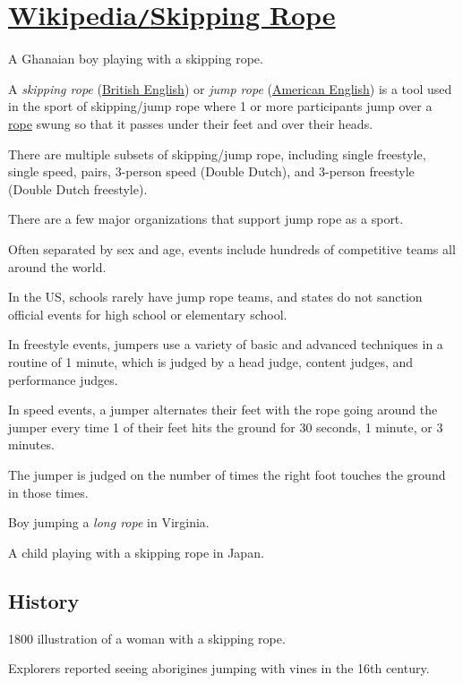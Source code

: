 \documentclass[oneside]{book}
\numberwithin{equation}{section}
\begin{document}

\section{\href{https://en.wikipedia.org/wiki/Skipping_rope}{Wikipedia\texttt{/}Skipping Rope}}
\textsf{A Ghanaian boy playing with a skipping rope.}

A \textit{skipping rope} (\href{https://en.wikipedia.org/wiki/British_English}{British English}) or \textit{jump rope} (\href{https://en.wikipedia.org/wiki/American_English}{American English}) is a tool used in the sport of skipping/jump rope where 1 or more participants jump over a \href{https://en.wikipedia.org/wiki/Rope}{rope} swung so that it passes under their feet and over their heads.

There are multiple subsets of skipping/jump rope, including single freestyle, single speed, pairs, 3-person speed (Double Dutch), and 3-person freestyle (Double Dutch freestyle).

%
There are a few major organizations that support jump rope as a sport.

Often separated by sex and age, events include hundreds of competitive teams all around the world.

In the US, schools rarely have jump rope teams, and states do not sanction official events for high school or elementary school.

In freestyle events, jumpers use a variety of basic and advanced techniques in a routine of 1 minute, which is judged by a head judge, content judges, and performance judges.

In speed events, a jumper alternates their feet with the rope going around the jumper every time 1 of their feet hits the ground for 30 seconds, 1 minute, or 3 minutes.

The jumper is judged on the number of times the right foot touches the ground in those times.

\textsf{Boy jumping a \textit{long rope} in Virginia.}

\textsf{A child playing with a skipping rope in Japan.}

\subsection{History}
\textsf{1800 illustration of a woman with a skipping rope.}

Explorers reported seeing aborigines jumping with vines in the 16th century.
\end{document}
